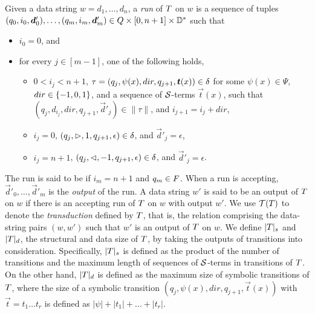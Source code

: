 Given a data string $w = d_1, \dots, d_n$, a \emph{run} of $T$ on $w$
is a sequence of tuples $(q_0, i_0, \vec{d}'_0), \ldots, (q_m, i_m, \vec{d}'_m) \in \controls \times [0, n+1] \times \data^*$ 
such that
\begin{itemize}
    \item $i_0 = 0$, and
    \item for every $j \in [m-1]$, one of the following holds,
    \begin{itemize}
  	\item  $0< i_j < n+1$, $\tau=(q_j, \psi(x), dir, q_{j+1}, \vec{t}(x)) \in \transrel$ for some $\psi(x) \in \Psi$, $dir \in \{-1, 0, 1\}$, and a sequence of  $\mathcal{S}$-terms $\vec{t}(x)$, such that $(q_j, d_{i_j}, dir, q_{j+1}, \vec{d}'_j) \in \|\tau\|$, and $i_{j+1} = i_j + dir$,
	\item $i_j = 0$, $(q_j, \vartriangleright, 1, q_{j+1}, \epsilon) \in \delta$, and $\vec{d}'_j  = \epsilon$,
	\item $i_j = n+1$, $(q_j, \vartriangleleft, -1, q_{j+1}, \epsilon) \in \delta$, and $\vec{d}'_j  = \epsilon$.
  \end{itemize}
\end{itemize}
The run is said to be  if $i_m = n+1$ and $q_m \in F$. When a run is accepting, $\vec{d}'_0, \ldots, \vec{d}'_m$ is the \emph{output} of the run.
A data string $w'$ is said to be an output of $T$ on $w$ if there is an accepting run of
$T$ on $w$ with output $w'$. We use $\mathcal{T}(T)$ to denote the \emph{transduction} defined by $T$, that is, the relation comprising the data-string pairs $(w, w')$ such that $w'$ is an output of $T$ on $w$.
%
We define $|T|_s$ and $|T|_d$, the structural and data size of $T$, by taking the outputs of transitions into consideration. Specifically, $|T|_s$ is defined as the product of the number of transitions and the maximum length of sequences of $\mathcal{S}$-terms in  transitions of $T$. 
On the other hand, $|T|_d$ is defined as the maximum size of symbolic transitions of $T$, where the size of a symbolic transition $(q_j, \psi(x), dir, q_{j+1}, \vec{t}(x))$ with $\vec{t}=t_1 \ldots t_r$ is defined as $|\psi| + |t_1| + \ldots + |t_r|$.


